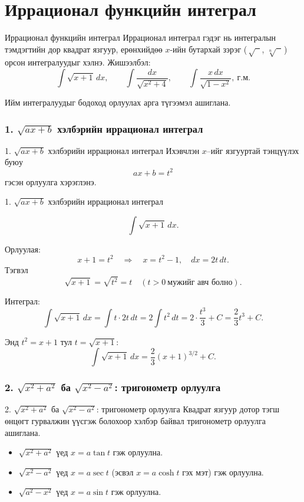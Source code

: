 \section{Иррационал функцийн интеграл}
\begin{frame}[allowframebreaks]{Иррационал функцийн интеграл}
Иррационал интеграл гэдэг нь интегралын тэмдэгтийн дор квадрат язгуур, ерөнхийдөө $x$-ийн бутархай зэрэг (\,$\sqrt{\phantom{x}}$, $\sqrt[n]{\phantom{x}}$\,) орсон интегралуудыг хэлнэ. Жишээлбэл:
\[
\int \sqrt{x+1}\,dx,\qquad 
\int \frac{dx}{\sqrt{x^2+4}},\qquad
\int \frac{x\,dx}{\sqrt{1-x^2}},\ \text{г.м.}
\]

Ийм интегралуудыг бодоход орлуулах арга түгээмэл ашиглана.
\end{frame}

\subsubsection*{1. $\sqrt{ax+b}$ хэлбэрийн иррационал интеграл}
\begin{frame}[allowframebreaks]{1. $\sqrt{ax+b}$ хэлбэрийн иррационал интеграл}
Ихэвчлэн $x$–ийг язгууртай тэнцүүлэх буюу
\[
 ax+b=t^2
\]
гэсэн орлуулга хэрэглэнэ.
\end{frame}

\begin{frame}[allowframebreaks]{1. $\sqrt{ax+b}$ хэлбэрийн иррационал интеграл}
\begin{example}
\[
\int \sqrt{x+1}\,dx.
\]

Орлуулая:
\[
x+1 = t^2 \quad\Rightarrow\quad x = t^2-1,\quad dx = 2t\,dt.
\]
Тэгвэл
\[
\sqrt{x+1} = \sqrt{t^2} = t \quad (t>0\ \text{мужийг авч болно}).
\]

Интеграл:
\[
\int \sqrt{x+1}\,dx
= \int t \cdot 2t\,dt
= 2\int t^2\,dt
= 2\cdot \frac{t^3}{3} + C
= \frac{2}{3}t^3 + C.
\]

Энд $t^2 = x+1$ тул $t=\sqrt{x+1}$:
\[
\int \sqrt{x+1}\,dx 
= \frac{2}{3}(x+1)^{3/2} + C.
\]
\end{example}
\end{frame}

\subsubsection*{2. $\sqrt{x^2+a^2}$ ба $\sqrt{x^2-a^2}$: тригонометр орлуулга}
\begin{frame}[allowframebreaks]{2. $\sqrt{x^2+a^2}$ ба $\sqrt{x^2-a^2}$: тригонометр орлуулга}
Квадрат язгуур дотор тэгш өнцөгт гурвалжин үүсгэж болохоор хэлбэр байвал тригонометр орлуулга ашиглана.

\begin{itemize}
  \item $\sqrt{x^2+a^2}$ үед $x = a\tan t$ гэж орлуулна.
  \item $\sqrt{x^2-a^2}$ үед $x = a\sec t$ (эсвэл $x=a\cosh t$ гэх мэт) гэж орлуулна.
  \item $\sqrt{a^2-x^2}$ үед $x = a\sin t$ гэж орлуулна.
\end{itemize}
\end{frame}


